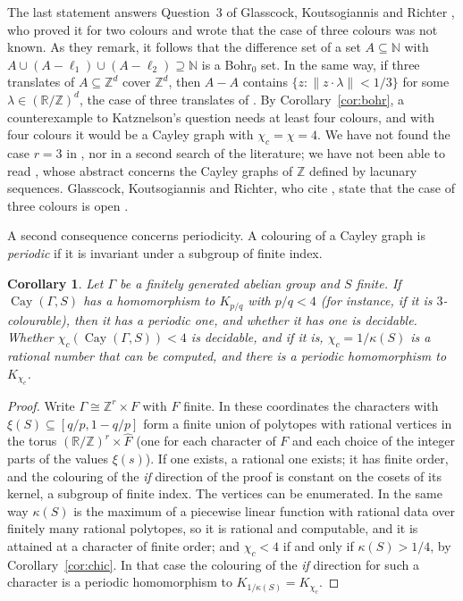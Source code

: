 \documentclass[11pt,a4paper]{amsart}
\newtheorem{corollary}[theorem]{Corollary}
\theoremstyle{definition}
\newcommand{\R}{\mathbb{R}}
\newcommand{\Z}{\mathbb{Z}}
\newcommand{\Cay}{\operatorname{Cay}}
\newcommand{\RZ}{\R/\Z}
\begin{document}
The last statement answers Question~3 of Glasscock, Koutsogiannis and Richter \cite{GKR}, who proved it for two
colours \cite[Theorem~4.9]{GKR} and wrote that the case of three colours was not known. As they remark, it follows
that the difference set of a set $A\subseteq\mathbb N$ with $A\cup(A-\ell_1)\cup(A-\ell_2)\supseteq\mathbb N$ is a
Bohr$_0$ set. In the same way, if three translates of $A\subseteq\Z^d$ cover $\Z^d$, then $A-A$ contains
$\{z:\|z\cdot\lambda\|<1/3\}$ for some $\lambda\in(\RZ)^d$, the case of three translates of \cite[Question~8]{GKR}.
By Corollary~\ref{cor:bohr}, a counterexample to Katznelson's question needs at least four colours, and with
four colours it would be a Cayley graph with $\chi_c=\chi=4$.
We have not found the case $r=3$ in \cite{GKR,Griesmer,HKM,LWYZ,Alweiss,BG}, nor in a second search of the
literature; we have not been able to read \cite{Katznelson}, whose abstract
concerns the Cayley graphs of $\Z$ defined by lacunary sequences. Glasscock, Koutsogiannis and Richter, who cite
\cite{Katznelson}, state that the case of three colours is open \cite{GKR}.

A second consequence concerns periodicity. A colouring of a Cayley graph is \emph{periodic} if it is invariant under
a subgroup of finite index.

\begin{corollary}\label{cor:periodic}
Let $\Gamma$ be a finitely generated abelian group and $S$ finite. If $\Cay(\Gamma,S)$ has a homomorphism to
$K_{p/q}$ with $p/q<4$ (for instance, if it is $3$-colourable), then it has a periodic one, and whether it has one is
decidable. Whether $\chi_c(\Cay(\Gamma,S))<4$ is decidable, and if it is, $\chi_c=1/\kappa(S)$ is a rational
number that can be computed, and there is a periodic homomorphism to $K_{\chi_c}$.
\end{corollary}

\begin{proof}
Write $\Gamma\cong\Z^r\times F$ with $F$ finite. In these coordinates the characters with
$\xi(S)\subseteq[q/p,1-q/p]$ form a finite union of polytopes with rational vertices in the torus
$(\RZ)^r\times\widehat F$ (one for each character of $F$ and each choice of the integer parts of the values
$\xi(s)$). If one exists, a rational one exists; it has finite order, and the colouring of the \emph{if} direction
of the proof is constant on the cosets of its kernel, a subgroup of finite index. The vertices can be enumerated.
In the same way $\kappa(S)$ is the maximum of a piecewise linear function with rational data over finitely many
rational polytopes, so it is rational and computable, and it is attained at a character of finite order; and
$\chi_c<4$ if and only if $\kappa(S)>1/4$, by Corollary~\ref{cor:chic}. In that case the colouring of the \emph{if}
direction for such a character is a periodic homomorphism to $K_{1/\kappa(S)}=K_{\chi_c}$.
\end{proof}
\end{document}
